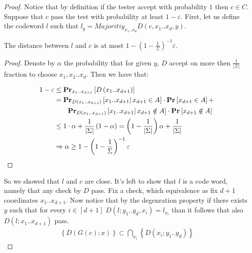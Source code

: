 \begin{proof}
  Notice that by definition if the tester accept with probability $1$ then $c \in C$. Suppose that $c$ pass the test with probability at least $1 - \varepsilon$. First, let us define the codeword $l$ such that $ l_{y} = Majoritiy_{x_1 .. x_{d}}D\left(c, x_{1}.. x_{d},y\right)$.

  \begin{claim} 
    The distance between $l$ and $c$ is at most $ 1- \left( 1 - \frac{1}{\Sigma} \right)^{-1}\varepsilon$.  
  \end{claim}
  \begin{proof} 
    Denote by $\alpha$ the probability that for given $y$, $D$ accept on more then $\frac{1}{|\Sigma|}$ fraction to choose $x_{1},x_{2}..x_{d}$. 
    Then we have that:  
    
    \begin{equation*}
      \begin{split}
        1 - \varepsilon  & \le \prbm{ D\left( x_1 .. x_{d+1} \right) }{x_1 .. x_{d+1}}  \\
        & = \prbcprb{  D\left( x_1 .. x_{d+1} \right)}{ x_1 .. x_{d+1}  }{ x_{d+1} \in A } + \\
        & \ \ \ \ \ \ \prbcprb{ D\left( x_1 .. x_{d+1} \right)}{ x_1 .. x_{d+1}   }{ x_{d+1} \notin A } \\
        & \le 1 \cdot \alpha +  \frac{1}{|\Sigma|}  \left( 1 - \alpha \right) = \left( 1 - \frac{1}{|\Sigma|} \right) \alpha  + \frac{1}{|\Sigma|} \\
       & \Rightarrow \alpha \ge  1- \left( 1 - \frac{1}{\Sigma} \right)^{-1}\varepsilon
      \end{split}
    \end{equation*}
  \end{proof} 

  So we showed that $l$ and $c$ are close. It's left to show that $l$ is a code word, namely that any check by $D$ pass. Fix a check, which equivalence as fix $d+1$ coordinates $x_{1} .. x_{d+1}$. Now notice that by the degenration property if there exists $y$ such that for every $i \in [d+1]$ $D\left(l; y_{1} .. y_{d}, x_{i} \right) = l_{x_{i}}$ than it follows that also $D\left(l; x_{1} .. x_{d+1} \right)$ pass.  
  \begin{equation*}
    \begin{split}
      \left\{ D(G(c) ; x ) \right\} \subset \bigcap_{ x_{i} } \left\{ D\left( x_{i} ; y_{1} .. y_{d} \right)  \right\} 
    \end{split}
  \end{equation*}
\end{proof}


